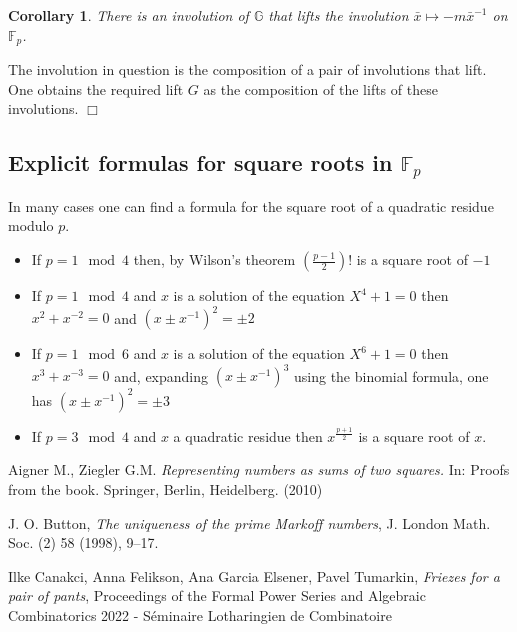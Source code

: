 \documentclass[12pt,a4paper]{amsart}
\newtheorem{coro}[thm]{Corollary}
\def\GG{\mathbb{G}}
\def\fp{\mathbb{F}_p}
\begin{document}
\begin{coro}
There is an involution of $\GG$ that lifts the involution 
$\bar{x} \mapsto -m\bar{x}^{-1}$ on $\fp$.
\end{coro}
\proof The involution in question is the composition of a pair of
involutions that lift. 
One obtains the required lift $G$ as the composition of the lifts of
these involutions. 
\hfill $\Box$

\subsection{Explicit formulas for square roots in $\fp$}

In many cases one can find a formula for the square root of a
quadratic residue modulo $p$.
\begin{itemize}
	\item If $p = 1 \mod 4$ then, by Wilson's theorem
		$\left(\frac{p-1}{2}\right)!$ is a square root of $-1$
	\item If $p = 1 \mod 4$ and $x$ is a solution of the
		equation
		$X^4+1 = 0$ then $x^2 + x^{-2}=0$
		and $(x\pm x^{-1})^2 = \pm 2$
	
	\item If $p = 1 \mod 6$ and $x$ is a solution of the
		equation
		$X^6+1 = 0$ then $x^3 + x^{-3}=0$
		and, expanding  $(x\pm x^{-1})^3$
		using the binomial formula, one has
		$(x\pm x^{-1})^2 = \pm 3$
	\item If $p = 3 \mod 4$ and $x$ a quadratic residue
		then $x^\frac{p+1}{2}$ is a square root of
		$x$.
		
\end{itemize}



Aigner M., Ziegler G.M.  
\textit{Representing numbers as sums of two squares.} In: Proofs from the book. Springer, Berlin, Heidelberg. (2010)


J. O. Button, 
\textit{The uniqueness of the prime Markoff numbers},
 J. London Math. Soc.
(2) 58 (1998), 9–17.

Ilke Canakci, Anna Felikson, Ana Garcia Elsener, Pavel Tumarkin,
\textit{Friezes for a pair of pants},
Proceedings of the Formal Power Series and Algebraic Combinatorics 2022 - Séminaire Lotharingien de Combinatoire
\end{document}
